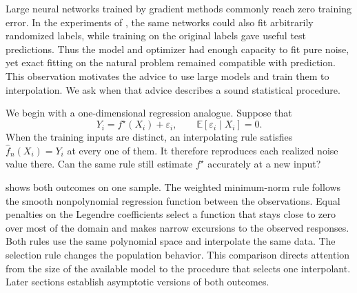 \documentclass[11pt,twoside]{article}
\newcommand{\E}{\mathbb E}
\theoremstyle{definition}
\theoremstyle{remark}
\begin{document}
Large neural networks trained by gradient methods commonly reach zero training
error. In the experiments of \citet{zhang2017}, the same networks could also
fit arbitrarily randomized labels, while training on the original labels gave
useful test predictions. Thus the model and optimizer had enough capacity to
fit pure noise, yet exact fitting on the natural problem remained compatible
with prediction. This observation motivates the advice to use large models and
train them to interpolation. We ask when that advice describes a sound
statistical procedure.

We begin with a one-dimensional regression analogue. Suppose that
\[
 Y_i=f^\star(X_i)+\varepsilon_i,
 \qquad \E[\varepsilon_i\mid X_i]=0.
\]
When the training inputs are distinct, an interpolating rule satisfies
$\widehat f_n(X_i)=Y_i$ at every one of them. It therefore reproduces each
realized noise value there. Can the same rule still estimate $f^\star$
accurately at a new input?



 shows both outcomes on one sample. The
weighted minimum-norm rule follows the smooth nonpolynomial regression
function between the observations. Equal penalties on the Legendre
coefficients select a function that stays close to zero over most of the
domain and makes narrow excursions to the observed responses. Both rules use
the same polynomial space and interpolate the same data. The selection rule
changes the population behavior. This comparison directs attention from the
size of the available model to the procedure that selects one interpolant.
Later sections establish asymptotic versions of both outcomes.%
\end{document}
